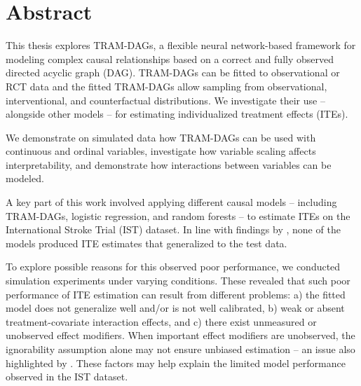 \documentclass[11pt,a4paper,twoside]{book}
\begin{document}
\cleardoublepage





\chapter*{Abstract}
\thispagestyle{plain}



This thesis explores TRAM-DAGs, a flexible neural network-based framework for modeling complex causal relationships based on a correct and fully observed directed acyclic graph (DAG). TRAM-DAGs can be fitted to observational or RCT data and the fitted TRAM-DAGs allow sampling from observational, interventional, and counterfactual distributions. We investigate their use -- alongside other models -- for estimating individualized treatment effects (ITEs). 

We demonstrate on simulated data how TRAM-DAGs can be used with continuous and ordinal variables, investigate how variable scaling affects interpretability, and demonstrate how interactions between variables can be modeled. 

A key part of this work involved applying different causal models -- including TRAM-DAGs, logistic regression, and random forests -- to estimate ITEs on the International Stroke Trial (IST) dataset. In line with findings by \citet{chen2025}, none of the models produced ITE estimates that generalized to the test data.

To explore possible reasons for this observed poor performance, we conducted simulation experiments under varying conditions. These revealed that such poor performance of ITE estimation can result from different problems: a) the fitted model does not generalize well and/or is not well calibrated, b) weak or absent treatment-covariate interaction effects, and c) there exist unmeasured or unobserved effect modifiers. When important effect modifiers are unobserved, the ignorability assumption alone may not ensure unbiased estimation -- an issue also highlighted by \citet{vegetabile2021}. These factors may help explain the limited model performance observed in the IST dataset.
\end{document}
